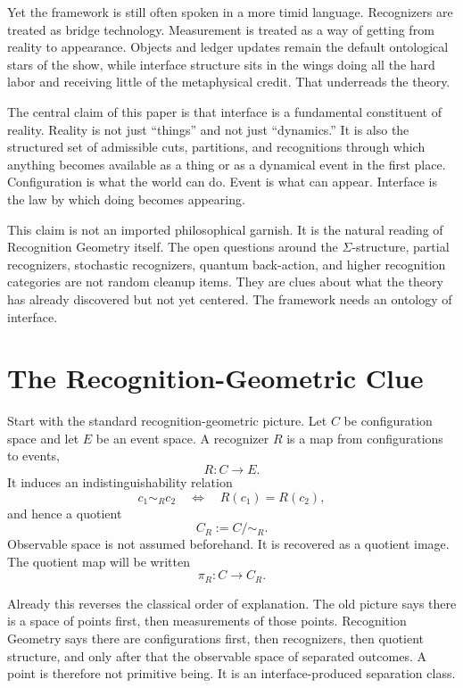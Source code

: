 \documentclass[11pt]{article}
\begin{document}
Yet the framework is still often spoken in a more timid language.
Recognizers are treated as bridge technology.
Measurement is treated as a way of getting from reality to appearance.
Objects and ledger updates remain the default ontological stars of the show, while interface structure sits in the wings doing all the hard labor and receiving little of the metaphysical credit.
That underreads the theory.

The central claim of this paper is that interface is a fundamental constituent of reality.
Reality is not just ``things'' and not just ``dynamics.''
It is also the structured set of admissible cuts, partitions, and recognitions through which anything becomes available as a thing or as a dynamical event in the first place.
Configuration is what the world can do.
Event is what can appear.
Interface is the law by which doing becomes appearing.

This claim is not an imported philosophical garnish.
It is the natural reading of Recognition Geometry itself.
The open questions around the $\Sigma$-structure, partial recognizers, stochastic recognizers, quantum back-action, and higher recognition categories are not random cleanup items.
They are clues about what the theory has already discovered but not yet centered.
The framework needs an ontology of interface.

\section{The Recognition-Geometric Clue}

Start with the standard recognition-geometric picture.
Let $C$ be configuration space and let $E$ be an event space.
A recognizer $R$ is a map from configurations to events,
\[
R : C \to E.
\]
It induces an indistinguishability relation
\[
c_1 \sim_R c_2 \quad \Longleftrightarrow \quad R(c_1)=R(c_2),
\]
and hence a quotient
\[
C_R := C/{\sim_R}.
\]
Observable space is not assumed beforehand.
It is recovered as a quotient image.
The quotient map will be written
\[
\pi_R : C \to C_R.
\]

Already this reverses the classical order of explanation.
The old picture says there is a space of points first, then measurements of those points.
Recognition Geometry says there are configurations first, then recognizers, then quotient structure, and only after that the observable space of separated outcomes.
A point is therefore not primitive being.
It is an interface-produced separation class.
\end{document}
